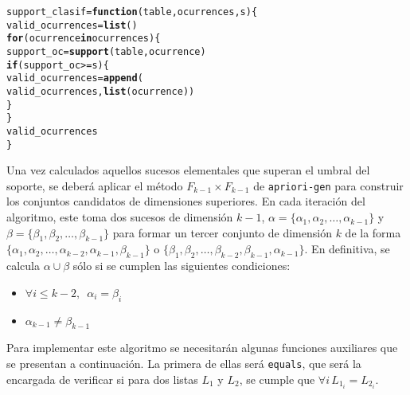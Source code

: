 \documentclass[12pt]{report}\usepackage[]{graphicx}\usepackage[dvipsnames]{xcolor}
\makeatletter
\newcommand{\hlopt}[1]{\textcolor[rgb]{0,0,0}{#1}}%
\newcommand{\hlstd}[1]{\textcolor[rgb]{0.345,0.345,0.345}{#1}}%
\newcommand{\hlkwa}[1]{\textcolor[rgb]{0.161,0.373,0.58}{\textbf{#1}}}%
\newcommand{\hlkwb}[1]{\textcolor[rgb]{0.69,0.353,0.396}{#1}}%
\newcommand{\hlkwc}[1]{\textcolor[rgb]{0.333,0.667,0.333}{#1}}%
\newcommand{\hlkwd}[1]{\textcolor[rgb]{0.737,0.353,0.396}{\textbf{#1}}}%
\newenvironment{kframe}{%
 \def\at@end@of@kframe{}%
 \ifinner\ifhmode%
  \def\at@end@of@kframe{\end{minipage}}%
  \begin{minipage}{\columnwidth}%
 \fi\fi%
 \def\FrameCommand##1{\hskip\@totalleftmargin \hskip-\fboxsep
 \colorbox{shadecolor}{##1}\hskip-\fboxsep
     \hskip-\linewidth \hskip-\@totalleftmargin \hskip\columnwidth}%
 \MakeFramed {\advance\hsize-\width
   \@totalleftmargin\z@ \linewidth\hsize
   \@setminipage}}%
 {\par\unskip\endMakeFramed%
 \at@end@of@kframe}
\newenvironment{knitrout}{}{} %
\makeatother
\begin{document}
\begin{knitrout}
\color{fgcolor}\begin{kframe}
\begin{alltt}
\hlstd{support_clasif} \hlkwb{=} \hlkwa{function}\hlstd{(}\hlkwc{table}\hlstd{,} \hlkwc{ocurrences}\hlstd{,} \hlkwc{s}\hlstd{) \{}
        \hlstd{valid_ocurrences} \hlkwb{=} \hlkwd{list}\hlstd{()}
        \hlkwa{for} \hlstd{(ocurrence} \hlkwa{in} \hlstd{ocurrences) \{}
                \hlstd{support_oc} \hlkwb{=} \hlkwd{support}\hlstd{(table, ocurrence)}
                \hlkwa{if} \hlstd{(support_oc} \hlopt{>=} \hlstd{s) \{}
                        \hlstd{valid_ocurrences} \hlkwb{=} \hlkwd{append}\hlstd{(}
                                \hlstd{valid_ocurrences,} \hlkwd{list}\hlstd{(ocurrence))}
                \hlstd{\}}
        \hlstd{\}}
        \hlstd{valid_ocurrences}
\hlstd{\}}
\end{alltt}
\end{kframe}
\end{knitrout}
			
			Una vez calculados aquellos sucesos elementales que superan el umbral del soporte, se deberá aplicar el método $F_{k-1} \times F_{k-1}$ de \texttt{apriori-gen} para construir los conjuntos candidatos de dimensiones superiores. En cada iteración del algoritmo, este toma dos sucesos de dimensión $k-1$, $\alpha = \{\alpha_1, \alpha_2, \ldots, \alpha_{k-1}\}$ y $\beta = \{\beta_1, \beta_2, \ldots, \beta_{k-1}\}$ para formar un tercer conjunto de dimensión $k$ de la forma $\{\alpha_1, \alpha_2, \ldots, \alpha_{k-2}, \alpha_{k-1}, \beta_{k-1}\}$ o $\{\beta_1, \beta_2, \ldots, \beta_{k-2}, \beta_{k-1}, \alpha_{k-1}\}$. En definitiva, se calcula $\alpha \cup \beta$ sólo si se cumplen las siguientes condiciones: 
			
			\begin{itemize}
				\item $\forall i \leq k-2, \,\,\, \alpha_i = \beta_i$
				\item $\alpha_{k-1} \neq \beta_{k-1}$
			\end{itemize}
			
			Para implementar este algoritmo se necesitarán algunas funciones auxiliares que se presentan a continuación. La primera de ellas será \texttt{equals}, que será la encargada de verificar si para dos listas $L_1$ y $L_2$, se cumple que $\forall i \, L_{1_i} = L_{2_i}$. 
\end{document}
